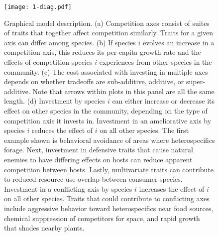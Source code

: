 \documentclass[12pt]{article}
\begin{document}
%
%

% 

\clearpage





\clearpage


\renewcommand{\thefigure}{\arabic{figure}}
\renewcommand{\theequation}{\arabic{equation}}
\renewcommand{\thetable}{\arabic{table}}
\setcounter{equation}{0}
\setcounter{figure}{0}
\setcounter{table}{0}


\begin{figure}[ht!]
\centering
\texttt{[image: 1-diag.pdf]}
\caption{Graphical model description.
% 
(a) Competition axes consist of suites of traits that together affect competition
similarly. Traits for a given axis can differ among species.
% 
(b) If species $i$ evolves an increase in a competition axis, this reduces its
per-capita growth rate and the effects of competition species $i$ experiences 
from other species in the community.
% 
(c) The cost associated with investing in multiple axes depends on whether 
tradeoffs are sub-additive, additive, or super-additive. 
Note that arrows within plots in this panel are all the same length.
% 
(d) Investment by species $i$ can either increase or decrease its effect on other
species in the community, depending on the type of competition axis it invests in.
Investment in an ameliorative axis by species $i$ reduces the effect of $i$ on all
other species.
The first example shown is behavioral avoidance of areas where heterospecifics
forage.
Next, investment in defensive traits that cause natural enemies to have 
differing effects on hosts can reduce apparent competition between hosts.
Lastly, multivariate traits can contribute to reduced resource-use overlap
between consumer species.
Investment in a conflicting axis by species $i$ increases the effect of $i$ on all
other species.
Traits that could contribute to conflicting axes include 
aggressive behavior toward heterospecifics near food sources,
chemical suppression of competitors for space, and
rapid growth that shades nearby plants.}
\label{fig:model-description}
\end{figure}
\end{document}
